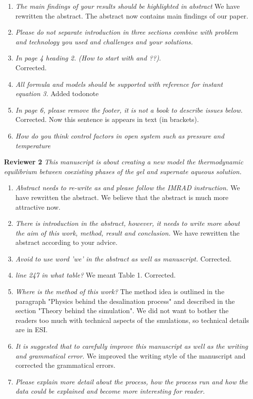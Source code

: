 \documentclass[12pt]{dinbrief}
\begin{document}
\begin{enumerate}
\item \textit{The main findings of your results should be highlighted in abstract} 
We have rewritten the abstract. The abstract now contains main findings of our paper.

\item \textit{Please do not separate introduction in three sections combine with problem and technology you used and challenges and your solutions.}

\item \textit{In page 4 heading 2. (How to start with and ??)}.\\
Corrected.

\item \textit{All formula and models should be supported with reference for instant equation 3.}
Added todonote

\item \textit{In page 6, please remove the footer, it is not a book to describe issues below}.\\
Corrected. Now this sentence is appears in text (in brackets).


\item \textit{How do you think control factors in open system such as pressure and temperature}

\end{enumerate}


\textbf{Reviewer 2}
\textit{This manuscript is about creating a new model the thermodynamic equilibrium between coexisting phases of the gel and supernate aqueous solution.}
\begin{enumerate}

\item \textit{Abstract needs to re-write as and please follow the IMRAD instruction.}
We have rewritten the abstract. We believe that the abstract is much more attractive now.
\item \textit{There is introduction in the abstract, however, it needs to write more about the aim of this work, method, result and conclusion.}
We have rewritten the abstract according to your advice.
\item \textit{Avoid to use word 'we' in the abstract as well as manuscript.}
Corrected.
\item \textit{line 247 in what table?}
We meant Table 1. Corrected.
\item \textit{Where is the method of this work?} 
The method idea is outlined in the paragraph "Physics behind the desalination process" and described in the section "Theory behind the simulation". We did not want to bother the readers too much with technical aspects of the smulations, so technical details are in ESI.
\item \textit{It is suggested that to carefully improve this manuscript as well as the writing and grammatical error.}
We improved the writing style of the manuscript and corrected the grammatical errors.
\item \textit{Please explain more detail about the process, how the process run and how the data could be explained and become more interesting for reader.}

\end{enumerate}
\end{document}
